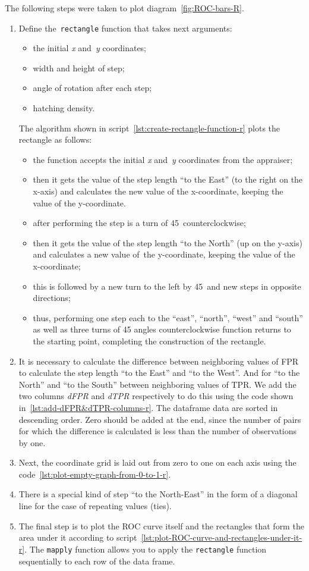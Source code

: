 \documentclass[]{scrreprt}
\begin{document}
The following steps were taken to plot diagram~\ref{fig:ROC-bars-R}.
\begin{enumerate}
	\item Define the~\texttt{rectangle} function that takes next arguments:
	\begin{itemize}
		\item the initial \emph{x} and~\emph{y} coordinates;
		\item width and height of step;
		\item angle of rotation after each step;
		\item hatching density.
	\end{itemize}
	The algorithm shown in script~\ref{lst:create-rectangle-function-r} plots the rectangle as follows:
	\begin{itemize}
		\item the function accepts the initial \emph{x} and~\emph{y} coordinates from the appraiser;
		\item then it gets the value of the step length ``to the East'' (to the right on the x-axis) and calculates the new value of the x-coordinate, keeping the value of the y-coordinate.
		\item after performing the step is a turn of 45\textdegree \ counterclockwise;
		\item then it gets the value of the step length ``to the North'' (up on the y-axis) and calculates a new value of~the y-coordinate, keeping the value of the x-coordinate;
		\item this is followed by a new turn to the left by 45\textdegree \ and new steps in opposite directions;
		\item thus, performing one step each to the ``east'', ``north'', ``west'' and ``south'' as well as three turns of 45 angles counterclockwise function returns to the starting point, completing the construction of the rectangle.
	\end{itemize}
	\item It is necessary to calculate the difference between neighboring values of FPR to calculate the step length ``to the East'' and ``to the West''. And for ``to the North'' and ``to the South'' between neighboring values of TPR. We add the two columns \emph{dFPR} and \emph{dTPR} respectively to do this using the code shown in~\ref{lst:add-dFPR&dTPR-columns-r}. The dataframe data are sorted in descending order. Zero should be added at the end, since the number of pairs for which the difference is calculated is less than the number of observations by one.
	\item Next, the coordinate grid is laid out from zero to one on each axis using the code~\ref{lst:plot-empty-graph-from-0-to-1-r}.
	\item There is a special kind of step ``to the North-East'' in the form of a diagonal line for the case of repeating values (ties).
	\item The final step is to plot the ROC curve itself and the rectangles that form the area under it according to script~\ref{lst:plot-ROC-curve-and-rectangles-under-it-r}. The \texttt{mapply} function allows you to apply the \texttt{rectangle} function sequentially to each row of the data frame.
\end{enumerate}
\end{document}
